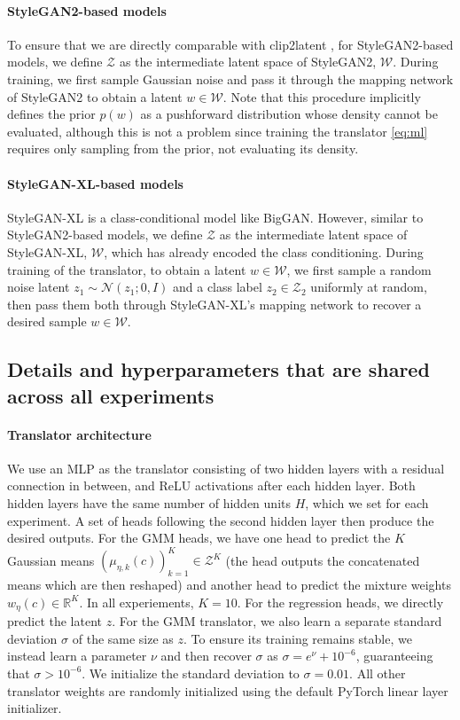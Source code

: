 \documentclass[nohyperref]{article}
\theoremstyle{plain}
\theoremstyle{definition}
\theoremstyle{remark}
\begin{document}
\paragraph{StyleGAN2-based models} To ensure that we are directly comparable with clip2latent \citep{Pinkney2022clip2latent}, for StyleGAN2-based models, we define $\mathcal{Z}$ as the intermediate latent space of StyleGAN2, $\mathcal{W}$. During training, we first sample Gaussian noise and pass it through the mapping network of StyleGAN2 to obtain a latent $w \in \mathcal{W}$. Note that this procedure implicitly defines the prior $p(w)$ as a pushforward distribution whose density cannot be evaluated, although this is not a problem since training the translator \eqref{eq:ml} requires only sampling from the prior, not evaluating its density.


\paragraph{StyleGAN-XL-based models} 
StyleGAN-XL is a class-conditional model like BigGAN. However, similar to StyleGAN2-based models, we define $\mathcal{Z}$ as the intermediate latent space of StyleGAN-XL, $\mathcal{W}$, which has already encoded the class conditioning. During training of the translator, to obtain a latent $w \in \mathcal{W}$, we first sample a random noise latent $z_1  \sim \mathcal{N}(z_1; 0, I)$ and a class label $z_2 \in \mathcal{Z}_2$ uniformly at random, then pass them both through StyleGAN-XL's mapping network to recover a desired sample $w \in \mathcal{W}$.


\subsection{Details and hyperparameters that are shared across all experiments}

\paragraph{Translator architecture} We use an MLP as the translator consisting of two hidden layers with a residual connection in between, and ReLU activations after each hidden layer. 
Both hidden layers have the same number of hidden units $H$, which we set for each experiment. 
A set of heads following the second hidden layer then produce the desired outputs. For the GMM heads, we have one head to predict the $K$ Gaussian means $(\mu_{\eta, k}(c))_{k=1}^K \in \mathcal{Z}^K$ (the head outputs the concatenated means which are then reshaped) and another head to predict the mixture weights $w_\eta(c) \in \mathbb{R}^K$. In all experiements, $K=10$. For the regression heads, we directly predict the latent $z$. For the GMM translator, we also learn a separate standard deviation $\sigma$ of the same size as $z$. To ensure its training remains stable, we instead learn a parameter $\nu$ and then recover $\sigma$ as $\sigma = e^{\nu}+10^{-6}$, guaranteeing that $\sigma > 10^{-6}$. We initialize the standard deviation to $\sigma=0.01$. All other translator weights are randomly initialized using the default PyTorch \citep{NEURIPS2019_9015} linear layer initializer.
\end{document}
